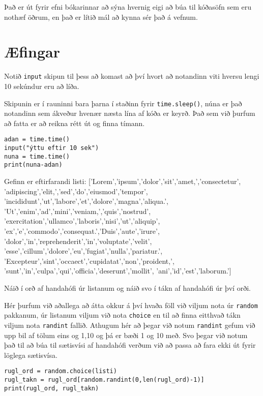 Það er út fyrir efni bókarinnar að sýna hvernig eigi að búa til kóðasöfn sem eru nothæf öðrum, en það er lítið mál að kynna sér það á vefnum.

\newpage
\section{Æfingar}

\begin{exercise}\label{imp1}
Notið \texttt{input} skipun til þess að komast að því hvort að notandinn viti hversu lengi 10 sekúndur eru að líða. 
\end{exercise}
\begin{Answer}[ref={imp1}]
Skipunin er í rauninni bara þarna í staðinn fyrir \texttt{time.sleep()}, núna er það notandinn sem ákveður hvenær næsta lína af kóða er keyrð.
Það sem við þurfum að fatta er að reikna rétt út og finna tímann.
	\begin{lstlisting}
adan = time.time()
input("ýttu eftir 10 sek")
nuna = time.time()
print(nuna-adan)\end{lstlisting}
\end{Answer}


\begin{exercise}\label{imp2}
Gefinn er eftirfarandi listi: 
['Lorem','ipsum','dolor','sit','amet,','consectetur',
'adipiscing','elit,','sed','do','eiusmod','tempor',
'incididunt','ut','labore','et','dolore','magna','aliqua.',
'Ut','enim','ad','mini','veniam,','quis','nostrud',
'exercitation','ullamco','laboris','nisi','ut','aliquip',
'ex','e','commodo','consequat.','Duis','aute','irure',
'dolor','in','reprehenderit','in','voluptate','velit',
'esse','cillum','dolore','eu','fugiat','nulla','pariatur.',
'Excepteur','sint','occaect','cupidatat','non','proident,',
'sunt','in','culpa','qui','officia','deserunt','mollit',
'ani','id','est','laborum.']

Náið í orð af handahófi úr listanum og náið svo í tákn af handahófi úr því orði.
\end{exercise}
\begin{Answer}[ref={imp2}]
Hér þurfum við aðallega að átta okkur á því hvaða föll við viljum nota úr \texttt{random} pakkanum, úr listanum viljum við nota \texttt{choice} en til að finna eitthvað tákn viljum nota \texttt{randint} fallið.
Athugum hér að þegar við notum \texttt{randint} gefum við upp bil af tölum eins og 1,10 og þá er bæði 1 og 10 með.
Svo þegar við notum það til að búa til sætisvísi af handahófi verðum við að passa að fara ekki út fyrir löglega sætisvísa.
	\begin{lstlisting}
rugl_ord = random.choice(listi)
rugl_takn = rugl_ord[random.randint(0,len(rugl_ord)-1)]
print(rugl_ord, rugl_takn)\end{lstlisting}
\newpage
\end{Answer}